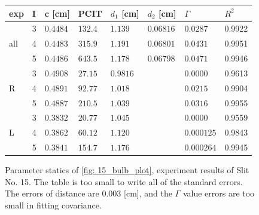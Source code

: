 \documentclass{article}
\begin{document}
\begin{figure}[H]
    \begin{tabular}{  m{0.6cm}|m{0.3cm}|m{1.7cm}|m{1.7cm}|m{2cm}|m{2cm}|m{2cm}|m{1cm} } 
        exp & I & c [cm]& PCIT & $d_1$ [cm] & $d_2$ [cm] & $\Gamma$ & $R^2$ \\ \hline \hline
        \multirow{3}{*}{all}& 3 & $0.4484$& $132.4$& $1.139$& $0.06816$& $0.0287$& 0.9922\\ \cline{2-8}
                            & 4 & $0.4483$& $315.9$& $1.191$& $0.06801$& $0.0431$& 0.9951\\ \cline{2-8} 
                            & 5 & $0.4486$& $643.5$& $1.178$& $0.06798$& $0.0471$& 0.9946\\ \hline
        \multirow{3}{*}{R}  & 3 & $0.4908$& $27.15$& $0.9816$&& $0.0000$& 0.9613\\ \cline{2-8}
                            & 4 &$0.4891$& $92.77$& $1.018$&& $0.0215$& 0.9904\\ \cline{2-8}
                            & 5 &$0.4887$& $210.5$& $1.039$&& $0.0316$& 0.9955\\ \hline
        \multirow{3}{*}{L}  & 3 &  $0.3832$& $20.77$& $1.045$&& $0.0000$& 0.9559\\ \cline{2-8}
                            & 4 & $0.3862$& $60.12$& $1.120$&& $0.000125$& 0.9843\\ \cline{2-8}
                            & 5 & $0.3841$& $154.7$& $1.176$&& $0.000264 $& 0.9945\\ \hline
    \end{tabular}
    \caption{Parameter statics of \ref{fig: 15_bulb_plot}, experiment results of Slit No. 15.
     The table is too small to write all of the standard errors.
     The errors of distance are $0.003$ [cm], and the $\Gamma$ value errors are too small in fitting covariance.
    }
    \label{fig: 15_bulb_parmeters}
\end{figure}
\end{document}
